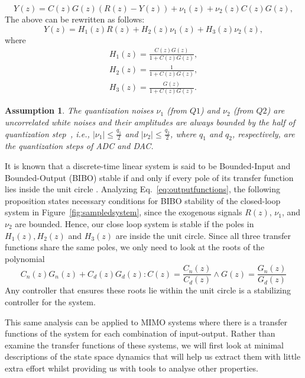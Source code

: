 \documentclass[sigconf]{llncs}
\newtheorem{assumption}{Assumption}
\begin{document}
%
\begin{equation}
Y(z)=C(z)G(z)(R(z)-Y(z))+\nu_{1}(z)+\nu_{2}(z)C(z)G(z),
\end{equation}
%
The above can be rewritten as follows:
%
\begin{equation}
\label{eq:outputfunctions}
Y(z)=H_1(z)R(z)+H_2(z)\nu_{1}(z)+H_3(z)\nu_{2}(z),
\end{equation}
%
where
%
\begin{align}
H_1(z)=\frac{C(z)G(z)}{1+C(z)G(z)},\\
H_2(z)=\frac{1}{1+C(z)G(z)},\\
H_3(z)=\frac{G(z)}{1+C(z)G(z)}.
\end{align}
%

\begin{assumption}
\label{whitenoise}
%
The quantization noises $\nu_{1}$ (from $Q1$) and $\nu_{2}$ (from $Q2$) are
uncorrelated white noises and their amplitudes are always bounded by the
half of quantization step~\cite{astrom1997computer}, i.e., $\vert \nu_{1}
\vert \leq \frac{q_{1}}{2}$ and $\vert \nu_{2} \vert \leq \frac{q_{2}}{2}$,
where $q_{1}$ and $q_{2}$, respectively, are the quantization steps of ADC
and DAC.
% 
\end{assumption}

It is known that a discrete-time linear system is said to be Bounded-Input and Bounded-Output
(BIBO) stable if and only if every pole of its transfer function lies inside
the unit circle \cite{Astrom08}.  Analyzing Eq.~\eqref{eq:outputfunctions}, the following
proposition states necessary conditions for BIBO stability of the closed-loop system
in Figure~\ref{fig:sampledsystem}, since the exogenous signals $R(z)$,
$\nu_{1}$, and $\nu_{2}$ are bounded. Hence, our close loop system is stable if the poles in
$H_1(z) , H_2(z) $ and $H_3(z)$ are inside the unit circle. Since all three transfer functions share the same poles,
we only need to look at the roots of the polynomial
$$C_n(z)G_n(z)+C_d(z)G_d(z) : C(z)=\frac{C_n(z)}{C_d(z)} \wedge G(z)=\frac{G_n(z)}{G_d(z)}$$
Any controller that ensures these roots lie within the unit circle is a stabilizing controller for the system.

This same analysis can be applied to MIMO systems where there is a transfer functions of the system
for each combination of input-output. Rather than examine the transfer functions of these systems, we will first
look at minimal descriptions of the state space dynamics that will help us extract them with little extra effort whilst 
providing us with tools to analyse other properties.
\end{document}
